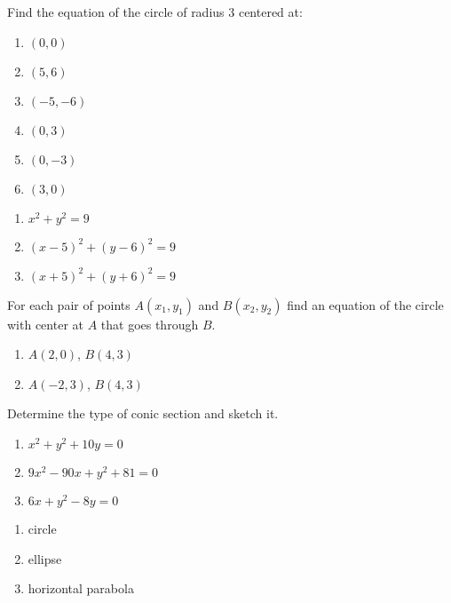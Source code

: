 \begin{enumialphparenastyle}
\begin{multicols}{2}
\begin{ex}
Find the equation of the circle of radius 3 centered at:
\begin{multicols}{2}
\begin{enumerate}
	\item	$(0,0)$
	\item	$(5,6)$
	\item	$(-5,-6)$
	\item	$(0,3)$
	\item	$(0,-3)$
	\item	$(3,0)$
\end{enumerate}
\end{multicols}
\begin{sol}
\begin{enumerate}
	\item	$x^2+y^2=9$
	\item	$(x-5)^2+(y-6)^2=9$
	\item	$(x+5)^2+(y+6)^2=9$
\end{enumerate}
\end{sol}
\end{ex}

\begin{ex}
For each pair of points $A(x_1,y_1)$ and $B(x_2,y_2)$ find an equation of
the circle with center at $A$ that goes through $B$.
\begin{multicols}{2}
\begin{enumerate}
	\item	$A(2,0)$, $B(4,3)$
	\item	$A(-2,3)$, $B(4,3)$
\end{enumerate}
\end{multicols}
\end{ex}

\begin{ex}
Determine the type of conic section and sketch it.
\begin{enumerate}
	\item	$x^2+y^2+10y=0$
	\item	$9x^2-90x+y^2+81=0$
	\item	$6x+y^2-8y=0$
\end{enumerate}
\begin{sol}
\begin{enumerate}
	\item	circle
	\item	ellipse
	\item	horizontal parabola
\end{enumerate}
\end{sol}
\end{ex}


\end{multicols}
\end{enumialphparenastyle}
